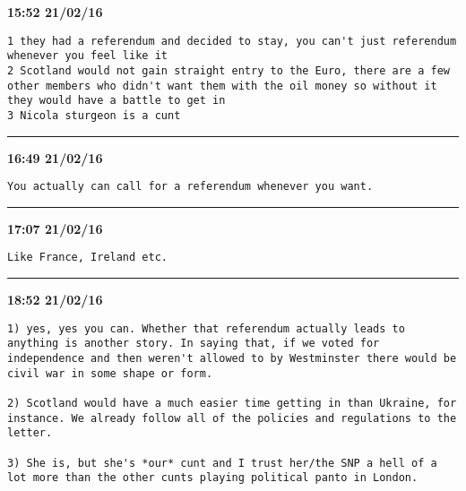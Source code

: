\begin{adjustwidth}{0cm}{0cm}
\footnotesize \textbf{15:52 21/02/16}

\begin{lstlisting}[breaklines, breakatwhitespace, basicstyle=\small, frame=leftline]
1 they had a referendum and decided to stay, you can't just referendum whenever you feel like it
2 Scotland would not gain straight entry to the Euro, there are a few other members who didn't want them with the oil money so without it they would have a battle to get in
3 Nicola sturgeon is a cunt
\end{lstlisting}
\end{adjustwidth}

\hrule%

\begin{adjustwidth}{2cm}{0cm}
\footnotesize \textbf{16:49 21/02/16}

\begin{lstlisting}[breaklines, breakatwhitespace, basicstyle=\small, frame=leftline]
You actually can call for a referendum whenever you want.
\end{lstlisting}
\end{adjustwidth}

\hrule%

\begin{adjustwidth}{4cm}{0cm}
\footnotesize \textbf{17:07 21/02/16}

\begin{lstlisting}[breaklines, breakatwhitespace, basicstyle=\small, frame=leftline]
Like France, Ireland etc.
\end{lstlisting}
\end{adjustwidth}

\hrule%

\begin{adjustwidth}{2cm}{0cm}
\footnotesize \textbf{18:52 21/02/16}

\begin{lstlisting}[breaklines, breakatwhitespace, basicstyle=\small, frame=leftline]
1) yes, yes you can. Whether that referendum actually leads to anything is another story. In saying that, if we voted for independence and then weren't allowed to by Westminster there would be civil war in some shape or form.

2) Scotland would have a much easier time getting in than Ukraine, for instance. We already follow all of the policies and regulations to the letter.

3) She is, but she's *our* cunt and I trust her/the SNP a hell of a lot more than the other cunts playing political panto in London.


\end{lstlisting}
\end{adjustwidth}

